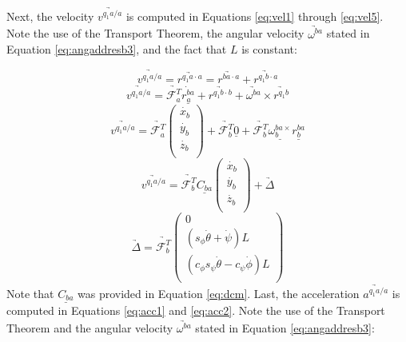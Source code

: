 \documentclass[journal]{IEEEtran}
\begin{document}
Next, the velocity $\underrightarrow{v^{q_1a/a}}$ is computed in Equations \ref{eq:vel1} through \ref{eq:vel5}. Note the use of the Transport Theorem, the angular velocity $\underrightarrow{\omega^{ba}}$ stated in Equation \ref{eq:angaddresb3}, and the fact that $L$ is constant:

\begin{equation}
	\underrightarrow{v^{q_1a/a}}=\underrightarrow{r^{q_1a\cdot{a}}}=\underrightarrow{r^{ba\cdot{a}}}+\underrightarrow{r^{q_1b\cdot{a}}}
	\label{eq:vel1}
\end{equation}
\begin{equation}
	\underrightarrow{v^{q_1a/a}}=\underrightarrow{\mathcal{F}^T_a}\underline{\dot{r^{ba}_a}}+\underrightarrow{r^{q_1b\cdot{b}}}+	\underrightarrow{\omega^{ba}}\times\underrightarrow{r^{q_1b}}
	\label{eq:vel2}
\end{equation}
\begin{equation}
	\underrightarrow{v^{q_1a/a}}=\underrightarrow{\mathcal{F}^T_a}\left( \begin{array}{c}
			\dot{x_b} \\
			\dot{y_b} \\
			\dot{z_b} \\
			\end{array} \right)+\underrightarrow{\mathcal{F}^T_b}\underline{0}+\underrightarrow{\mathcal{F}^T_b}\underline{\omega^{ba\times}_b}\underline{r^{ba}_b}
	\label{eq:vel3}
\end{equation}
\begin{equation}
	\underrightarrow{v^{q_1a/a}}=\underrightarrow{\mathcal{F}^T_b}\underline{C_{ba}}\left( \begin{array}{c}
			\dot{x_b} \\
			\dot{y_b} \\
			\dot{z_b} \\
			\end{array} \right)+\underrightarrow{\Delta}		
	\label{eq:vel4}
\end{equation}
\begin{equation}
	\underrightarrow{\Delta}=\underrightarrow{\mathcal{F}^T_b}\left(    \begin{array}{c}
						0 \\
			(s_{\phi}\dot{\theta}+\dot{\psi})L \\
			(c_{\phi}s_{\psi}\dot{\theta}-c_{\psi}\dot{\phi})L \\
						\end{array} \right)		
	\label{eq:vel5}
\end{equation}
Note that $\underline{C_{ba}}$ was provided in Equation \ref{eq:dcm}. Last, the acceleration $\underrightarrow{a^{q_1a/a}}$ is computed in Equations \ref{eq:acc1} and \ref{eq:acc2}. Note the use of the Transport Theorem and the angular velocity $\underrightarrow{\omega^{ba}}$ stated in Equation \ref{eq:angaddresb3}:
\end{document}
